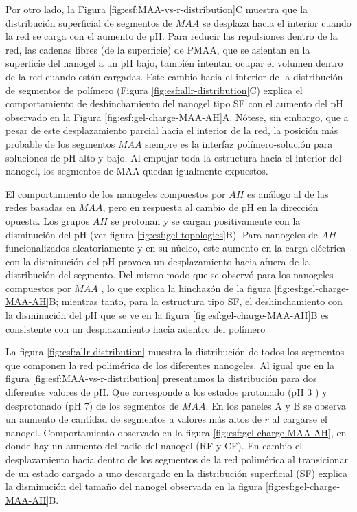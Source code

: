 Por otro lado, la Figura \ref{fig:esf:MAA-vs-r-distribution}C muestra que la distribuci\'on superficial de segmentos de $MAA$ se desplaza hacia el interior cuando la red se carga con el aumento de pH. Para reducir las repulsiones dentro de la red, las cadenas libres (de la superficie) de PMAA, que se asientan en la superficie del nanogel a un pH bajo, tambi\'en intentan ocupar el volumen dentro de la red cuando est\'an cargadas. Este cambio hacia el interior de la distribuci\'on de segmentos de pol\'imero (Figura \ref{fig:esf:allr-distribution}C) explica el comportamiento de deshinchamiento del nanogel tipo SF con el aumento del pH observado en la Figura \ref{fig:esf:gel-charge-MAA-AH}A. N\'otese, sin embargo, que a pesar de este desplazamiento parcial hacia el interior de la red, la posici\'on m\'as probable de los segmentos $MAA$ siempre es la interfaz pol\'imero-soluci\'on para soluciones de pH alto y bajo. Al empujar toda la estructura hacia el interior del nanogel, los segmentos de MAA quedan igualmente expuestos.





El comportamiento de los nanogeles compuestos por $AH$ es an\'alogo al de las redes basadas en $MAA$, pero en respuesta al cambio de pH en la direcci\'on opuesta.
Los grupos $AH$ se protonan y se cargan positivamente con la disminuci\'on del pH (ver figura \ref{fig:esf:gel-topologies}B).
Para nanogeles de $AH$ funcionalizados aleatoriamente y en su n\'ucleo, este aumento en la carga el\'ectrica con la disminuci\'on del pH provoca un desplazamiento hacia afuera de la distribuci\'on del segmento. Del mismo modo que se observ\'o para los nanogeles compuestos por $MAA$%
, lo que explica la hinchaz\'on de la figura \ref{fig:esf:gel-charge-MAA-AH}B;
mientras tanto, para la estructura tipo SF, el deshinchamiento con la disminuci\'on del pH que se ve en la figura \ref{fig:esf:gel-charge-MAA-AH}B es consistente con un desplazamiento hacia adentro del pol\'imero %


La figura \ref{fig:esf:allr-distribution} muestra la distribuci\'on de todos los segmentos que componen la red polim\'erica de los diferentes nanogeles. 
Al igual que en la figura \ref{fig:esf:MAA-vs-r-distribution} presentamos la distribuci\'on para dos diferentes valores de pH. Que corresponde a los estados protonado (pH 3 ) y desprotonado (pH 7) de los segmentos de $MAA$.  En los paneles A y B se observa un aumento de cantidad de segmentos a valores m\'as altos de $r$ al cargarse el nanogel. Comportamiento observado en la figura \ref{fig:esf:gel-charge-MAA-AH}, en donde hay un aumento del radio del nanogel (RF y CF).
En cambio el desplazamiento hacia dentro de los segmentos de la red polim\'erica al transicionar de un estado cargado a uno descargado en la distribuci\'on superficial (SF) explica la disminuci\'on del tama\~no del nanogel observada en la figura \ref{fig:esf:gel-charge-MAA-AH}B.

